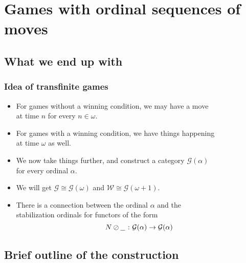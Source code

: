 \documentclass{beamer}
\newcommand*\from{\colon}
\newcommand{\cmap}[3]{#1\from{}#2\to{}#3}
\newcommand{\sequoid}{\oslash}
\newcommand{\G}{\mathcal G}
\newcommand{\nsb}{N\sequoid\underline{\hspace{1.5ex}}\;}
\begin{document}
\section{Games with ordinal sequences of moves}

\subsection{What we end up with}

\begin{frame}
  \frametitle{Idea of transfinite games}

  \begin{itemize}
    \item For games without a winning condition, we may have a move \\
      at time $n$ for every $n\in\omega$.  
    \item For games with a winning condition, we have things happening \\
      at time $\omega$ as well.  
    \item We now take things further, and construct a category $\G(\alpha)$ \\
      for every ordinal $\alpha$.  
    \item We will get $\G\cong\G(\omega)$ and $\mathcal W\cong\G(\omega+1)$.
    \item There is a connection between the ordinal $\alpha$ and the \\
      stabilization ordinals for functors of the form
      \[
        \cmap{\nsb}{\G(\alpha)}{\G(\alpha)}
        \]
  \end{itemize}
\end{frame}

\subsection{Brief outline of the construction}
\end{document}
